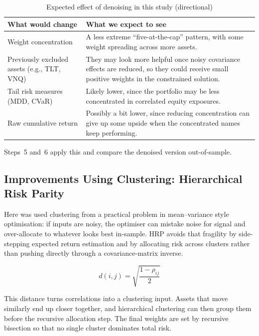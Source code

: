 \documentclass[11pt,a4paper]{article}
\begin{document}
\begin{table}[H]
\centering
\caption{Expected effect of denoising in this study (directional)}
\label{tab:denoise_impact}
{\small\setlength{\tabcolsep}{4pt}\renewcommand{\arraystretch}{1.15}\begin{tabularx}{\textwidth}{>{\raggedright\arraybackslash}p{4.0cm} X}
\toprule
What would change & What we expect to see \\
\midrule
Weight concentration & A less extreme ``five-at-the-cap'' pattern, with some weight spreading across more assets. \\
Previously excluded assets (e.g., TLT, VNQ) & They may look more helpful once noisy covariance effects are reduced, so they could receive small positive weights in the constrained solution. \\
Tail risk measures (MDD, CVaR) & Likely lower, since the portfolio may be less concentrated in correlated equity exposures. \\
Raw cumulative return & Possibly a bit lower, since reducing concentration can give up some upside when the concentrated names keep performing. \\
\bottomrule
\end{tabularx}}
\end{table}

Steps~5 and~6 apply this and compare the denoised version out-of-sample.

\subsection{Improvements Using Clustering: Hierarchical Risk Parity}

Here was used clustering from a practical problem in mean--variance style optimisation:
if inputs are noisy, the optimiser can mistake noise for signal and over-allocate to whatever looks
best in-sample. HRP avoids that fragility by side-stepping expected return estimation and by
allocating risk across clusters rather than pushing directly through a covariance-matrix inverse.

\[
d(i,j)=\sqrt{\frac{1-\rho_{ij}}{2}}
\]

This distance turns correlations into a clustering input. Assets that move similarly end up closer
together, and hierarchical clustering can then group them before the recursive allocation step.
The final weights are set by recursive bisection so that no single cluster dominates total risk.
\end{document}
